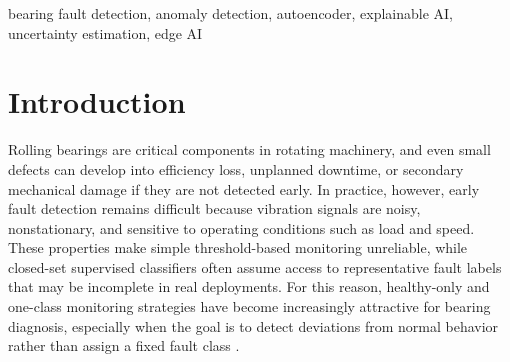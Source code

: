 \begin{abstract}
Early bearing faults are difficult to separate from normal vibration variability because machine signals are noisy, nonstationary, and sensitive to load changes. Many monitoring pipelines still rely on brittle thresholds or closed-set classifiers that can overstate confidence and transfer poorly across operating conditions. This paper presents VibeTwin, a lightweight generative digital twin for bearing vibration monitoring built around a compact 1D-CNN autoencoder trained only on healthy signal windows, with a variational autoencoder retained as a comparison baseline. Faults are detected through reconstruction-based anomaly scoring relative to the learned healthy manifold. To make alerts more reliable, the framework augments reconstruction scores with uncertainty estimates from stochastic inference and calibrated thresholds. It also explains suspicious windows through counterfactual healthy reconstruction and frequency-aware residual analysis that highlights FFT and PSD band changes. Validation is centered on healthy-only training on CWRU, followed by external robustness checks on Paderborn, with XJTU-SY reserved as an optional degradation-oriented extension. In addition to anomaly detection quality, the evaluation plan targets false-alarm behavior, robustness under noise and load shift, explanation usefulness, and edge feasibility through model size and CPU latency.
\end{abstract}

\begin{IEEEkeywords}
bearing fault detection, anomaly detection, autoencoder, explainable AI, uncertainty estimation, edge AI
\end{IEEEkeywords}

\section{Introduction}

Rolling bearings are critical components in rotating machinery, and even small defects can develop into efficiency loss, unplanned downtime, or secondary mechanical damage if they are not detected early. In practice, however, early fault detection remains difficult because vibration signals are noisy, nonstationary, and sensitive to operating conditions such as load and speed. These properties make simple threshold-based monitoring unreliable, while closed-set supervised classifiers often assume access to representative fault labels that may be incomplete in real deployments. For this reason, healthy-only and one-class monitoring strategies have become increasingly attractive for bearing diagnosis, especially when the goal is to detect deviations from normal behavior rather than assign a fixed fault class \cite{zhao2023hybridAE,hao2023oselm}.

